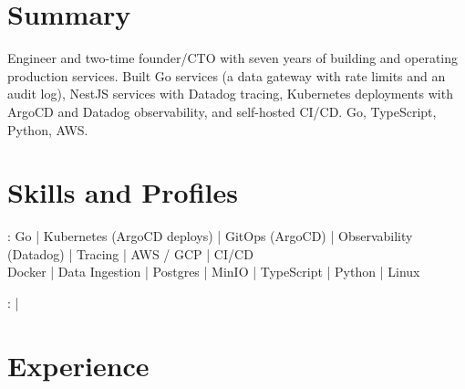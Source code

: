 \documentclass[print]{jack-resume}
\begin{document}
\pagecolor{darkmodeBackground}


\begin{minipage}[t][1cm][t]{.03\textwidth}
    \hfill
\end{minipage}

\section{Summary}
Engineer and two-time founder/CTO with seven years of building and operating production services. Built Go services (a data gateway with rate limits and an audit log), NestJS services with Datadog tracing, Kubernetes deployments with ArgoCD and Datadog observability, and self-hosted CI/CD. Go, TypeScript, Python, AWS.
\sectionsep

\section{Skills and Profiles}
:
Go \hfill | \hfill
Kubernetes (ArgoCD deploys) \hfill | \hfill
GitOps (ArgoCD) \hfill | \hfill
Observability (Datadog) \hfill | \hfill
Tracing \hfill | \hfill
AWS / GCP \hfill | \hfill
CI/CD \\
\hspace{1.0cm} Docker \hfill | \hfill
Data Ingestion \hfill | \hfill
Postgres \hfill | \hfill
MinIO \hfill | \hfill
TypeScript \hfill | \hfill
Python \hfill | \hfill
Linux \\

\raggedright{
    :
      \href{https://www.linkedin.com/in/jack-sturtevant/}{ \ExternalLink} |
     \href{https://github.com/jacksturt}{ \ExternalLink}}

\section{Experience}
\end{document}
